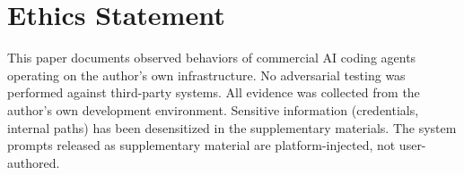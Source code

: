 \documentclass[sigconf,anonymous]{acmart}
\begin{document}

\section*{Ethics Statement}

This paper documents observed behaviors of commercial AI coding agents operating on the author's own infrastructure. No adversarial testing was performed against third-party systems. All evidence was collected from the author's own development environment. Sensitive information (credentials, internal paths) has been desensitized in the supplementary materials. The system prompts released as supplementary material are platform-injected, not user-authored.




\end{document}
